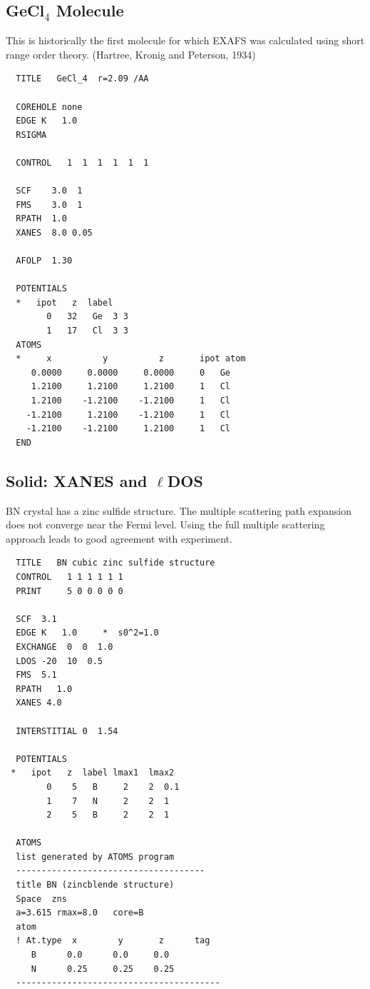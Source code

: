 \documentclass[11pt,oneside]{report} %
\begin{document}
\subsection{GeCl$_4$ Molecule}
\label{sec:Molecule-1}

This is historically the first molecule for which EXAFS was calculated using short range order
theory. (Hartree, Kronig and Peterson, 1934)

\begin{verbatim}
  TITLE   GeCl_4  r=2.09 /AA
  
  COREHOLE none
  EDGE K   1.0
  RSIGMA
  
  CONTROL   1  1  1  1  1  1
  
  SCF    3.0  1
  FMS    3.0  1
  RPATH  1.0
  XANES  8.0 0.05
  
  AFOLP  1.30
  
  POTENTIALS
  *   ipot   z  label
        0   32   Ge  3 3
        1   17   Cl  3 3
  ATOMS
  *     x          y          z       ipot atom        
     0.0000     0.0000     0.0000     0   Ge
     1.2100     1.2100     1.2100     1   Cl
     1.2100    -1.2100    -1.2100     1   Cl
    -1.2100     1.2100    -1.2100     1   Cl
    -1.2100    -1.2100     1.2100     1   Cl
  END
\end{verbatim}


\subsection{Solid: XANES and $\ell$DOS}
\label{sec:Solid-1}
BN crystal has a zinc sulfide structure.  The
multiple scattering path expansion does not converge near the Fermi level.
Using the full multiple scattering approach leads to good agreement
with experiment.

\begin{verbatim}
  TITLE   BN cubic zinc sulfide structure
  CONTROL   1 1 1 1 1 1
  PRINT     5 0 0 0 0 0 
 
  SCF  3.1
  EDGE K   1.0     *  s0^2=1.0
  EXCHANGE  0  0  1.0
  LDOS -20  10  0.5
  FMS  5.1
  RPATH   1.0
  XANES 4.0
 
  INTERSTITIAL 0  1.54
 
  POTENTIALS
 *   ipot   z  label lmax1  lmax2
        0    5   B     2    2  0.1
        1    7   N     2    2  1
        2    5   B     2    2  1
 
  ATOMS
  list generated by ATOMS program
  -------------------------------------
  title BN (zincblende structure)
  Space  zns
  a=3.615 rmax=8.0   core=B
  atom
  ! At.type  x        y       z      tag
     B      0.0      0.0     0.0
     N      0.25     0.25    0.25
  ----------------------------------------
\end{verbatim}
\end{document}
